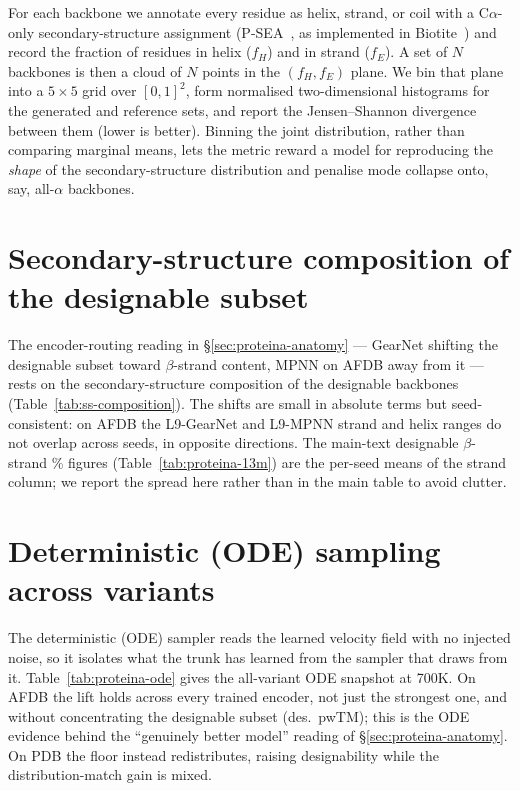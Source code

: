 \documentclass[12pt,a4paper,twoside]{report}
\begin{document}
For each backbone we annotate every residue as helix, strand, or coil with a C$\alpha$-only secondary-structure assignment (P-SEA~\cite{PSEA}, as implemented in Biotite~\cite{Biotite}) and record the fraction of residues in helix ($f_H$) and in strand ($f_E$). A set of $N$ backbones is then a cloud of $N$ points in the $(f_H, f_E)$ plane. We bin that plane into a $5\times5$ grid over $[0,1]^2$, form normalised two-dimensional histograms for the generated and reference sets, and report the Jensen--Shannon divergence between them (lower is better). Binning the joint distribution, rather than comparing marginal means, lets the metric reward a model for reproducing the \emph{shape} of the secondary-structure distribution and penalise mode collapse onto, say, all-$\alpha$ backbones.

\section{Secondary-structure composition of the designable subset}
\label{app:ss-composition}

The encoder-routing reading in \S\ref{sec:proteina-anatomy} --- GearNet shifting the designable subset toward $\beta$-strand content, MPNN on AFDB away from it --- rests on the secondary-structure composition of the designable backbones (Table~\ref{tab:ss-composition}). The shifts are small in absolute terms but seed-consistent: on AFDB the L9-GearNet and L9-MPNN strand and helix ranges do not overlap across seeds, in opposite directions. The main-text designable $\beta$-strand \% figures (Table~\ref{tab:proteina-13m}) are the per-seed means of the strand column; we report the spread here rather than in the main table to avoid clutter.



\section{Deterministic (ODE) sampling across variants}
\label{app:ode}

The deterministic (ODE) sampler reads the learned velocity field with no injected noise, so it isolates what the trunk has learned from the sampler that draws from it. Table~\ref{tab:proteina-ode} gives the all-variant ODE snapshot at 700K. On AFDB the lift holds across every trained encoder, not just the strongest one, and without concentrating the designable subset (des.\ pwTM); this is the ODE evidence behind the ``genuinely better model'' reading of \S\ref{sec:proteina-anatomy}. On PDB the floor instead redistributes, raising designability while the distribution-match gain is mixed.
\end{document}
